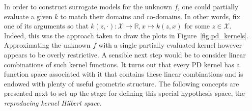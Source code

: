 In order to construct surrogate models for the unknown $f$, one could partially evaluate a given $k$ to match their domains and co-domains. In other words, fix one of its arguments so that $k(z,\cdot): \mathcal{X} \rightarrow \mathbb{R}, x \mapsto k(z,x)$ for some $z \in \mathcal{X}$. Indeed, this was the approach taken to draw the plots in Figure~\ref{fig.pd_kernels}. Approximating the unknown $f$ with a single partially evaluated kernel however appears to be overly restrictive. A sensible next step would be to consider linear combinations of such kernel functions. It turns out that every PD kernel has a function space associated with it that contains these linear combinations and is endowed with plenty of useful geometric structure. The following concepts are presented next to set up the stage for defining this special hypothesis space, the \textit{reproducing kernel Hilbert space}.

